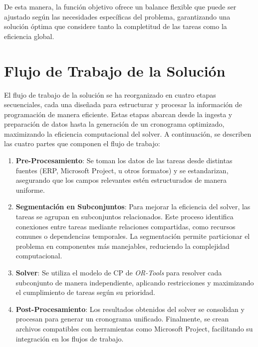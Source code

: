 \documentclass{article}
\begin{document}
De esta manera, la función objetivo ofrece un balance flexible que puede ser ajustado según las necesidades específicas del problema, garantizando una solución óptima que considere tanto la completitud de las tareas como la eficiencia global.



\section{Flujo de Trabajo de la Solución}

El flujo de trabajo de la solución se ha reorganizado en cuatro etapas secuenciales, cada una diseñada para estructurar y procesar la información de programación de manera eficiente. Estas etapas abarcan desde la ingesta y preparación de datos hasta la generación de un cronograma optimizado, maximizando la eficiencia computacional del solver. A continuación, se describen las cuatro partes que componen el flujo de trabajo:

\begin{enumerate}
    \item \textbf{Pre-Procesamiento}: Se toman los datos de las tareas desde distintas fuentes (ERP, Microsoft Project, u otros formatos) y se estandarizan, asegurando que los campos relevantes estén estructurados de manera uniforme.

    \item \textbf{Segmentación en Subconjuntos}: Para mejorar la eficiencia del solver, las tareas se agrupan en subconjuntos relacionados. Este proceso identifica conexiones entre tareas mediante relaciones compartidas, como recursos comunes o dependencias temporales. La segmentación permite particionar el problema en componentes más manejables, reduciendo la complejidad computacional.

    \item \textbf{Solver}: Se utiliza el modelo de CP de \textit{OR-Tools} para resolver cada subconjunto de manera independiente, aplicando restricciones y maximizando el cumplimiento de tareas según su prioridad.

    \item \textbf{Post-Procesamiento}: Los resultados obtenidos del solver se consolidan y procesan para generar un cronograma unificado. Finalmente, se crean archivos compatibles con herramientas como Microsoft Project, facilitando su integración en los flujos de trabajo.
\end{enumerate}
\end{document}
